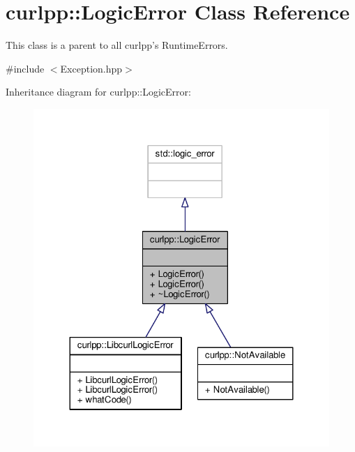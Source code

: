 \hypertarget{classcurlpp_1_1LogicError}{\section{curlpp\-:\-:Logic\-Error Class Reference}
\label{classcurlpp_1_1LogicError}
}


This class is a parent to all curlpp's Runtime\-Errors.  




{\ttfamily \#include $<$Exception.\-hpp$>$}



Inheritance diagram for curlpp\-:\-:Logic\-Error\-:\nopagebreak
\begin{figure}[H]
\begin{center}
\leavevmode
\includegraphics[width=324pt]{classcurlpp_1_1LogicError__inherit__graph}
\end{center}
\end{figure}


